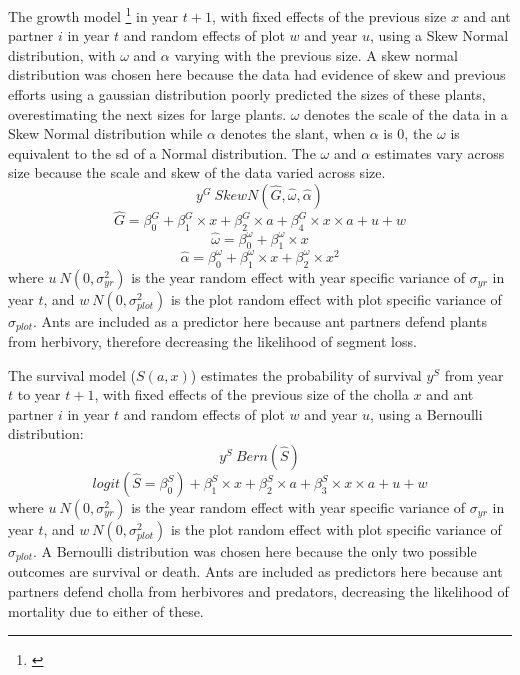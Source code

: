 \documentclass[11pt]{article}
\newcommand{\ali}[2]{{\color{pink}{#1}}\footnote{\textit{\color{pink}{#2}}}}
\begin{document}
The growth model \ali{($G(x',x,a)$) estimates the size of cholla $y^G$}{This is where I get a little confused between the x and x' sizes and the ys. Should this all be noted like this?} in year $t+1$, with fixed effects of the previous size $x$ and ant partner $i$ in year $t$ and random effects of plot $w$ and year $u$, using a Skew Normal distribution, with $\omega$ and $\alpha$ varying with the previous size. 
A skew normal distribution was chosen here because the data had evidence of skew and previous efforts using a gaussian distribution poorly predicted the sizes of these plants, overestimating the next sizes for large plants.
$\omega$ denotes the scale of the data in a Skew Normal distribution while $\alpha$ denotes the slant, when $\alpha$ is 0, the $\omega$ is equivalent to the sd of a Normal distribution. 
The $\omega$ and $\alpha$ estimates vary across size because the scale and skew of the data varied across size. 
$$y^G ~ Skew N(\hat{G},\hat{\omega},\hat{\alpha})$$
$$\hat{G} = \beta_{0}^{G} + \beta_{1}^{G} \times x + \beta_{2}^{G} \times a + \beta_{4}^{G} \times x \times a + u + w$$
$$\hat{\omega} = \beta_{0}^{\omega} + \beta_{1}^{\omega} \times x$$
$$\hat{\alpha} = \beta_{0}^{\omega} + \beta_{1}^{\omega} \times x + \beta_{2}^{\omega} \times x^2$$
where $u ~ N(0,\sigma_{yr}^{2})$ is the year random effect with year specific variance of $\sigma_{yr}$ in year $t$, and $w ~ N(0,\sigma_{plot}^{2})$ is the plot random effect with plot specific variance of $\sigma_{plot}$.
Ants are included as a predictor here because ant partners defend plants from herbivory, therefore decreasing the likelihood of segment loss.

The survival model ($S(a,x)$) estimates the probability of survival $y^S$ from year $t$ to year $t+1$, with fixed effects of the previous size of the cholla $x$ and ant partner $i$ in year $t$ and random effects of plot $w$ and year $u$, using a Bernoulli distribution:
$$y^S ~ Bern(\hat{S})$$
$$logit(\hat{S} = \beta_{0}^{S}) + \beta_{1}^{S} \times x + \beta_{2}^{S} \times a + \beta_{3}^{S} \times x \times a + u + w$$
where $u ~ N(0,\sigma_{yr}^{2})$ is the year random effect with year specific variance of $\sigma_{yr}$ in year $t$, and $w ~ N(0,\sigma_{plot}^{2})$ is the plot random effect with plot specific variance of $\sigma_{plot}$.
A Bernoulli distribution was chosen here because the only two possible outcomes are survival or death. 
Ants are included as predictors here because ant partners defend cholla from herbivores and predators, decreasing the likelihood of mortality due to either of these. 
\end{document}
